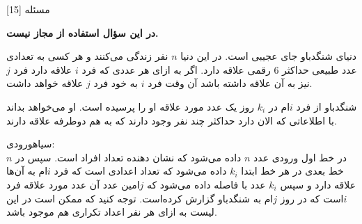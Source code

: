 ‌مسئله [15]

% 
%
%
% 

\textbf{در این سؤال استفاده از  مجاز نیست.}

دنیای شنگدباو جای عجیبی است. در این دنیا $n$ نفر زندگی می‌کنند و هر کسی به تعدادی عدد طبیعی حداکثر $6$ رقمی علاقه دارد. اگر به ازای هر عددی که فرد $i$ علاقه دارد فرد $j$نیز به آن علاقه داشته باشد آن وقت فرد $i$ به خود فرد $j$ علاقه خواهد داشت.

شنگدباو از فرد $i$ام در $k_i$ روز یک عدد مورد علاقه او را پرسیده است. او می‌خواهد بداند با اطلاعاتی که الان دارد حداکثر چند نفر وجود دارند که به هم دوطرفه علاقه دارند.  

‌سیاه{ورودی:}\\
در خط اول ورودی عدد $n$ داده می‌شود که نشان دهنده تعداد افراد است. سپس در $n$ خط بعدی در هر خط ابتدا $k_i$ داده می‌شود که تعداد اعدادی است که فرد $i$ام به آن‌ها علاقه دارد و سپس $k_i$ عدد با فاصله داده می‌شود که $j$امین عدد آن عدد مورد علاقه فرد $i$است که در روز $j$ام به شنگدباو گزارش کرده‌است. توجه کنید که ممکن است در این لیست به ازای هر نفر  اعداد تکراری هم موجود باشد.

